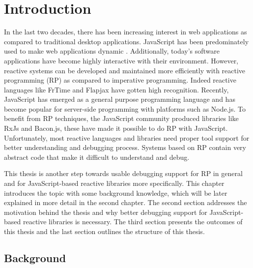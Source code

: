 \chapter{Introduction} \label{chap:Introduction}
In the last two decades, there has been increasing interest in web applications as compared to traditional desktop applications. JavaScript has been predominately used to make web applications dynamic \cite{6068340}. Additionally, today's software applications have become highly interactive with their environment. However, reactive systems can be developed and maintained more efficiently with reactive programming (RP) as compared to imperative programming. Indeed reactive languages like FrTime \cite{Cooper2006} and Flapjax \cite{Meyerovich:2009:FPL:1639949.1640091} have gotten high recognition.
Recently, JavaScript has emerged as a general purpose programming language and has become popular for server-side programming with platforms such as Node.js. To benefit from RP techniques, the JavaScript community produced libraries like RxJs and Bacon.js, these have made it possible to do RP with JavaScript.
Unfortunately, most reactive languages and libraries need proper tool support for better understanding and debugging process. 
Systems based on RP contain very abstract code that make it difficult to understand and debug.

This thesis is another step towards usable debugging support for RP in general and for JavaScript-based reactive libraries more specifically.
This chapter introduces the topic with some background knowledge, which will be later explained in more detail in the second chapter. The second section addresses the motivation behind the thesis and why better debugging support for JavaScript-based reactive libraries is necessary. The third section presents the outcomes of this thesis and the last section outlines the structure of this thesis.
\section{Background}

